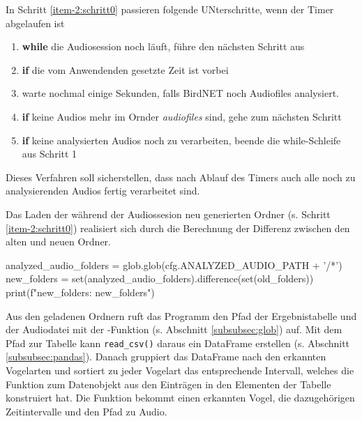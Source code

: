 

In Schritt \ref{item-2:schritt0} passieren folgende UNterschritte, wenn der Timer abgelaufen ist

\begin{enumerate}
    \item \textbf{while} die Audiosession noch läuft, führe den nächsten Schritt aus
    \item \textbf{if} die vom Anwendenden gesetzte Zeit ist vorbei
    \item warte nochmal einige Sekunden, falls BirdNET noch Audiofiles analysiert.
    \item \textbf{if} keine Audios mehr im Ornder \textit{audiofiles} sind, gehe zum nächsten Schritt
    \item \textbf{if} keine analysierten Audios noch zu verarbeiten, beende die while-Schleife aus Schritt 1 
\end{enumerate}

Dieses Verfahren soll sicherstellen, dass nach Ablauf des Timers auch alle noch zu analysierenden Audios fertig verarbeitet sind.

Das Laden der während der Audiossesion neu generierten Ordner (s. Schritt \ref{item-2:schritt0}) realisiert sich durch die Berechnung der Differenz zwischen den alten und neuen Ordner.

\begin{python}
        analyzed_audio_folders =  glob.glob(cfg.ANALYZED_AUDIO_PATH + '/*')
        new_folders = set(analyzed_audio_folders).difference(set(old_folders))
        print(f"new_folders: {new_folders}")
\end{python}

Aus den geladenen Ordnern ruft das Programm den Pfad der Ergebnistabelle und der Audiodatei mit der -Funktion (s. Abschnitt \ref{subsubsec:glob})
auf. Mit dem Pfad zur Tabelle kann \lstinline{read_csv()} daraus ein DataFrame erstellen (s. Abschnitt \ref{subsubsec:pandas}). Danach gruppiert  das DataFrame nach den erkannten Vogelarten und  sortiert zu jeder Vogelart das entsprechende Intervall, welches die Funktion  zum Datenobjekt  aus den Einträgen in den Elementen der Tabelle konstruiert hat. %
Die Funktion  bekommt einen erkannten Vogel, die dazugehörigen Zeitintervalle und den Pfad zu Audio.



